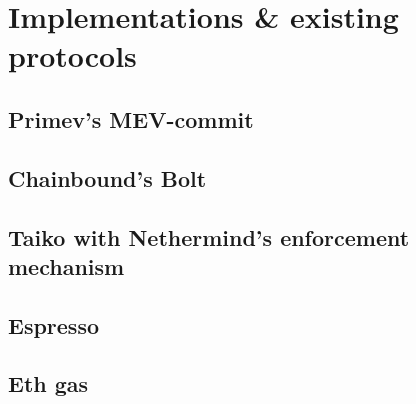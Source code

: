 \documentclass[conference]{IEEEtran}
\theoremstyle{boldstyle}
\begin{document}
\section{Implementations \& existing protocols}

        \subsection{ \textbf{Primev's MEV-commit}}
        

        \subsection{ \textbf{Chainbound's Bolt}}
        
        \subsection{ \textbf{Taiko with Nethermind's enforcement mechanism}}
        
        \subsection{ \textbf{Espresso}}
        
        \subsection{ \textbf{Eth gas}}
        
\end{document}
